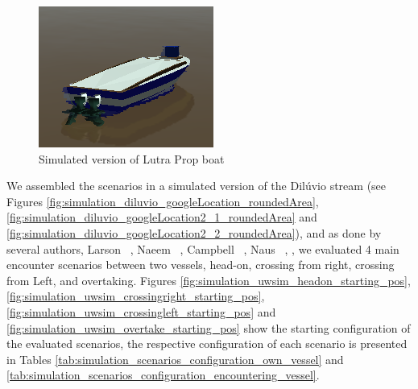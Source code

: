     \begin{figure}[H]
        \centering
        \includegraphics[scale=0.75]{figs/diffboat.png}
        \caption{Simulated version of Lutra Prop boat}
        \label{fig:diffboat}
    \end{figure}

    
    
     We assembled the scenarios in a simulated version of the Dilúvio stream (see Figures \ref{fig:simulation_diluvio_googleLocation_roundedArea}, \ref{fig:simulation_diluvio_googleLocation2_1_roundedArea} and \ref{fig:simulation_diluvio_googleLocation2_2_roundedArea}), and as done by several authors, \eg{} Larson \etal{} ~\cite{Larson2006Autonomous}, Naeem \etal{} ~\cite{Naeem2012COLREGS}, Campbell \etal{} ~\cite{Campbell2013Automatic}, Naus ~\cite{Naus2013Idea}, \etc{}, we evaluated 4 main encounter scenarios between two vessels, head-on, crossing from right, crossing from Left, and overtaking. Figures \ref{fig:simulation_uwsim_headon_starting_pos}, \ref{fig:simulation_uwsim_crossingright_starting_pos}, \ref{fig:simulation_uwsim_crossingleft_starting_pos} and \ref{fig:simulation_uwsim_overtake_starting_pos} show the starting configuration of the evaluated scenarios, the respective configuration of each scenario is presented in Tables \ref{tab:simulation_scenarios_configuration_own_vessel} and \ref{tab:simulation_scenarios_configuration_encountering_vessel}.
    
